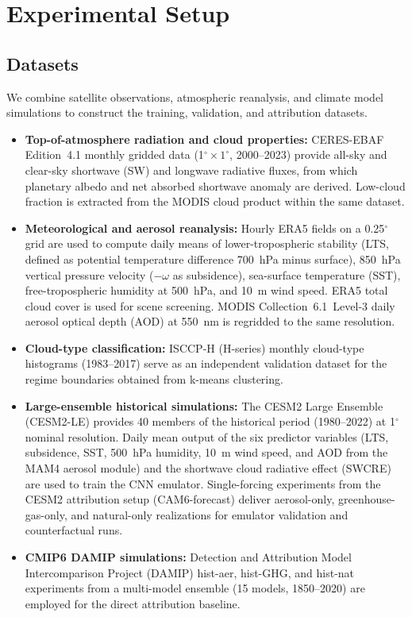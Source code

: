 \documentclass{article}
\begin{document}
\section{Experimental Setup}

\subsection{Datasets}
We combine satellite observations, atmospheric reanalysis, and climate model simulations to construct the training, validation, and attribution datasets.
\begin{itemize}
    \item \textbf{Top-of-atmosphere radiation and cloud properties:} CERES-EBAF Edition~4.1 monthly gridded data (1$^\circ\!\times\!1^\circ$, 2000--2023) provide all-sky and clear-sky shortwave (SW) and longwave radiative fluxes, from which planetary albedo and net absorbed shortwave anomaly are derived. Low-cloud fraction is extracted from the MODIS cloud product within the same dataset.
    \item \textbf{Meteorological and aerosol reanalysis:} Hourly ERA5 fields on a 0.25$^\circ$ grid are used to compute daily means of lower-tropospheric stability (LTS, defined as potential temperature difference 700~hPa minus surface), 850~hPa vertical pressure velocity ($-\omega$ as subsidence), sea-surface temperature (SST), free-tropospheric humidity at 500~hPa, and 10~m wind speed. ERA5 total cloud cover is used for scene screening. MODIS Collection~6.1~Level-3 daily aerosol optical depth (AOD) at 550~nm is regridded to the same resolution.
    \item \textbf{Cloud-type classification:} ISCCP-H (H-series) monthly cloud-type histograms (1983--2017) serve as an independent validation dataset for the regime boundaries obtained from k-means clustering.
    \item \textbf{Large-ensemble historical simulations:} The CESM2 Large Ensemble (CESM2-LE) provides 40 members of the historical period (1980--2022) at 1$^\circ$ nominal resolution. Daily mean output of the six predictor variables (LTS, subsidence, SST, 500~hPa humidity, 10~m wind speed, and AOD from the MAM4 aerosol module) and the shortwave cloud radiative effect (SWCRE) are used to train the CNN emulator. Single-forcing experiments from the CESM2 attribution setup (CAM6-forecast) deliver aerosol-only, greenhouse-gas-only, and natural-only realizations for emulator validation and counterfactual runs.
    \item \textbf{CMIP6 DAMIP simulations:} Detection and Attribution Model Intercomparison Project (DAMIP) hist-aer, hist-GHG, and hist-nat experiments from a multi-model ensemble (15 models, 1850--2020) are employed for the direct attribution baseline.
\end{itemize}
\end{document}
